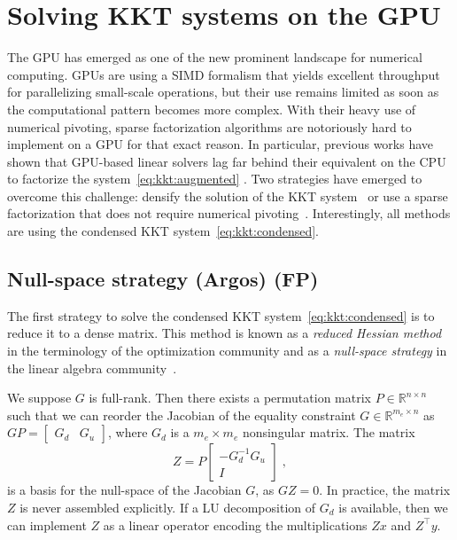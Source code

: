 \section{Solving KKT systems on the GPU}
The GPU has emerged as one of the new prominent landscape
for numerical computing. GPUs are using a SIMD formalism
that yields excellent throughput for parallelizing small-scale
operations, but their use remains limited as soon as the computational
pattern becomes more complex. With their heavy use of numerical
pivoting, sparse factorization algorithms are notoriously hard to implement
on a GPU for that exact reason. In particular, previous works have
shown that GPU-based linear solvers lag far behind their equivalent
on the CPU to factorize the system~\eqref{eq:kkt:augmented}
\cite{tasseff2019exploring,swirydowicz2021linear}. Two strategies
have emerged to overcome this challenge: densify the solution
of the KKT system~\cite{pacaud2022condensed} or use a sparse factorization that
does not require numerical pivoting~\cite{regev2023hykkt,shin2023accelerating}.
Interestingly, all methods are using the condensed KKT system~\eqref{eq:kkt:condensed}.

\subsection{Null-space strategy (Argos) (FP)}
\label{sec:kkt:nullspace}
The first strategy to solve the condensed KKT system~\eqref{eq:kkt:condensed}
is to reduce it to a dense matrix. This
method is known as a \emph{reduced Hessian method} in the
terminology of the optimization community \cite{biegler1995reduced}
and as a \emph{null-space strategy} in the linear algebra
community~\cite[Section 6]{benzi2005numerical}.

We suppose $G$ is full-rank.
Then there exists a permutation matrix $P \in \mathbb{R}^{n \times n}$
such that we can reorder the Jacobian of the equality constraint
$G \in \mathbb{R}^{m_e \times n}$ as $GP = \begin{bmatrix}
  G_d & G_u
\end{bmatrix}$, where $G_d$ is a $m_e \times m_e$ nonsingular matrix.
The matrix
\begin{equation}
  \label{eq:nullspace}
  Z = P \begin{bmatrix}
    - G_d^{-1} G_u \\ I
  \end{bmatrix} \; ,
\end{equation}
is a basis for the null-space of the Jacobian $G$, as $GZ = 0$.
In practice, the matrix $Z$ is never assembled explicitly.
If a LU decomposition of $G_d$ is available, then we can
implement $Z$ as a linear operator encoding the multiplications
$Z x$ and $Z^\top y$.

